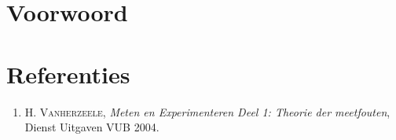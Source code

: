 \section*{Voorwoord}

\section*{Referenties}
\begin{enumerate}
	\item \textsc{H. Vanherzeele}, \textit{Meten en Experimenteren Deel 1: Theorie der meetfouten}, Dienst Uitgaven VUB 2004.
\end{enumerate}